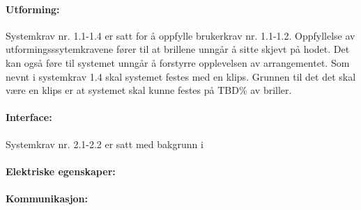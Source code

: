 \paragraph{Utforming: } 
Systemkrav nr. 1.1-1.4 er satt for å oppfylle brukerkrav nr. 1.1-1.2. Oppfyllelse av utformingsssytemkravene fører til at brillene unngår å sitte skjevt på hodet. Det kan også føre til systemet unngår å forstyrre opplevelsen av arrangementet. Som nevnt i systemkrav 1.4 skal systemet festes med en klips. Grunnen til det det skal være en klips er at systemet skal kunne festes på TBD\% av briller.  


\paragraph{Interface: }
Systemkrav nr. 2.1-2.2 er satt med bakgrunn i 


\paragraph{Elektriske egenskaper: }
\paragraph{Kommunikasjon: }




